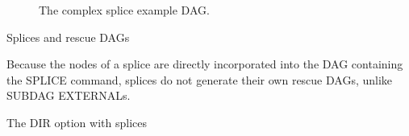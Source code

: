 \begin{figure}
\caption{\label{fig:dagman-splice-complex} The complex splice example DAG.}
\end{figure}

\begin{description}
\item[Splices and rescue DAGs]
\end{description}

Because the nodes of a splice are directly incorporated into the
DAG containing the SPLICE command, splices do not generate their
own rescue DAGs, unlike SUBDAG EXTERNALs.

\begin{description}
\item[The DIR option with splices]
\end{description}

